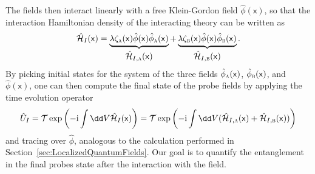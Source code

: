 \documentclass[letterpaper,12pt,titlepage,oneside,final]{book}
\newcommand{\mf}{\mathsf}%
\newcommand{\ii}{\mathrm{i}}
\newcommand{\tc}[1]{\textsc{#1}}
\begin{document}
    The fields then interact linearly with a free Klein-Gordon field $\hat{\phi}(\mf x)$, so that the interaction Hamiltonian density of the interacting theory can be written as
    \begin{equation}\label{eq:HI2fields}
        \hat{\mathcal{H}}_I(\mf x) = \underbrace{\lambda \zeta_\tc{a}(\mf x)\hat{\phi}(\mf x)\hat{\phi}_\tc{a}(\mf x)}_{\text{\normalsize  $\hat{\mathcal{H}}_{I,\tc{a}}(\mf x)$}} + \underbrace{\lambda\zeta_\tc{b}(\mf x)\hat\phi(\mf x) \hat{\phi}_\tc{b}(\mf x)}_{\text{\normalsize  $\hat{\mathcal{H}}_{I,\tc{b}}(\mf x)$}}.
    \end{equation}
    By picking initial states for the system of the three fields $\hat{\phi}_\tc{a}(\mf x)$, $\hat{\phi}_\tc{b}(\mf x)$, and $\hat{\phi}(\mf x)$, one can then compute the final state of the probe fields by applying the time evolution operator
    \begin{equation}
        \hat{U}_I = \mathcal{T}\exp\left(-\ii \int \dd V \hat{\mathcal{H}}_I(\mf x)\right) = \mathcal{T}\exp\left(- \ii \int \dd V (\hat{\mathcal{H}}_{I,\tc{a}}(\mf x) + \hat{\mathcal{H}}_{I,\tc{b}}(\mf x))\right)
    \end{equation}
    and tracing over $\hat\phi$, analogous to the calculation performed in Section~\ref{sec:LocalizedQuantumFields}. Our goal is to quantify the entanglement in the final probes state after the interaction with the field. 
    
\end{document}
